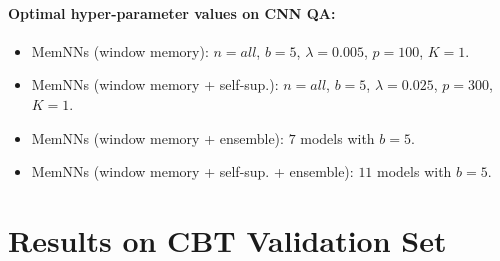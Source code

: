 \paragraph{Optimal hyper-parameter values on CNN QA:}

\begin{itemize}
\item  MemNNs (window memory): $n=all$, $b=5$, $\lambda=0.005$,
  $p=100$, $K=1$.
\item  MemNNs (window memory + self-sup.):  $n=all$, $b=5$, $\lambda=0.025$,
  $p=300$, $K=1$.
\item  MemNNs (window memory + ensemble): $7$ models with $b=5$.
\item  MemNNs (window memory + self-sup.  + ensemble): $11$ models with $b=5$.
\end{itemize}



\section{Results on CBT Validation Set} \label{ap:res_val}

